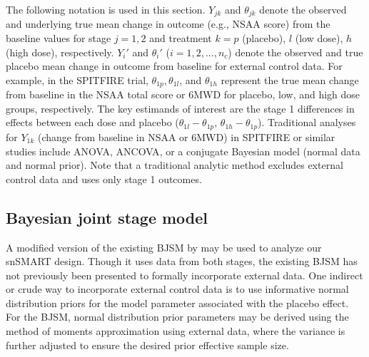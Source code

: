 The following notation is used in this section. $Y_{jk}$ and $\theta_{jk}$ denote the observed and underlying true mean change in outcome (e.g., \ac{NSAA} score) from the baseline values for stage $j = 1, 2$ and treatment $k = p$ (placebo), $l$ (low dose), $h$ (high dose), respectively. $Y_i'$ and $\theta_i'$ ($i = 1, 2, ..., n_c$) denote the observed and true placebo mean change in outcome from baseline for external control data. For example, in the SPITFIRE trial, $\theta_{1p}, \theta_{1l}$, and $\theta_{1h}$ represent the true mean change from baseline in the \ac{NSAA} total score or \ac{6MWD} for placebo, low, and high dose groups, respectively. The key estimands of interest are the stage 1 differences in effects between each dose and placebo ($\theta_{1l} - \theta_{1p}$,  $\theta_{1h} - \theta_{1p}$). Traditional analyses for $Y_{1k}$ (change from baseline in \ac{NSAA} or \ac{6MWD}) in SPITFIRE or similar studies include \ac{ANOVA}, \ac{ANCOVA}, or a conjugate Bayesian model (normal data and normal prior). Note that a traditional analytic method excludes external control data and uses only stage 1 outcomes. 

  


\subsection{Bayesian joint stage model}
A modified version of the existing \ac{BJSM} by \cite{fang2023comparing} may be used to analyze our \ac{snSMART} design. Though it uses data from both stages, the existing \ac{BJSM} has not previously been presented to formally incorporate external data. One indirect or crude way to incorporate external control data is to use informative normal distribution priors for the model parameter associated with the placebo effect. For the \ac{BJSM}, normal distribution prior parameters may be derived using the method of moments approximation using external data, where the variance is further adjusted to ensure the desired prior effective sample size. 


